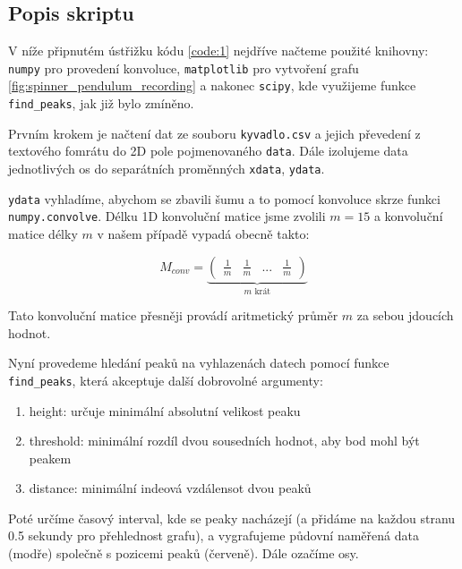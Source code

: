 \documentclass[12pt, a4paper,
 twoside,        %
 openright
]{report}
\begin{document}
\subsection{Popis skriptu}

V níže připnutém ústřižku kódu \ref{code:1} nejdříve načteme použité knihovny: 
\texttt{numpy} \cite{numpy} pro provedení konvoluce, 
\texttt{matplotlib} pro vytvoření grafu \ref{fig:spinner_pendulum_recording} \cite{matplotlib} a nakonec
\texttt{scipy}, kde využijeme funkce \texttt{find\_peaks}, jak již bylo zmíněno.

Prvním krokem je načtení dat ze souboru \texttt{kyvadlo.csv} a jejich převedení z textového fomrátu do 2D pole pojmenovaného \texttt{data}.
Dále izolujeme data jednotlivých os do separátních proměnných \texttt{xdata}, \texttt{ydata}.

\texttt{ydata} vyhladíme, abychom se zbavili šumu a to pomocí konvoluce skrze funkci \texttt{numpy.convolve}.
Délku 1D konvoluční matice jsme zvolili $m = 15$ a konvoluční matice délky $m$ v našem případě vypadá obecně takto:

\begin{equation}
    \label{eq:conv_matrix_avg}
    M_{conv} = 
    \underbrace{
        \begin{pmatrix}
            \frac{1}{m} & \frac{1}{m} & ... & \frac{1}{m}
        \end{pmatrix}
    }_{m\text{ krát}}
\end{equation}

Tato konvoluční matice přesněji provádí aritmetický průměr $m$ za sebou jdoucích hodnot.

Nyní provedeme hledání peaků na vyhlazenách datech pomocí funkce \texttt{find\_peaks}, která akceptuje další dobrovolné argumenty:
\begin{enumerate}[topsep=0pt, partopsep=0pt]
    \setlength{\itemsep}{0pt}%
    \setlength{\parskip}{0pt}%
    \item height: určuje minimální absolutní velikost peaku
    \item threshold: minimální rozdíl dvou sousedních hodnot, aby bod mohl být peakem
    \item distance: minimální indeová vzdálensot dvou peaků
\end{enumerate}

Poté určíme časový interval, kde se peaky nacházejí (a přidáme na každou stranu 0.5 sekundy pro přehlednost grafu),
a vygrafujeme půdovní naměřená data (modře) společně s pozicemi peaků (červeně). Dále ozačíme osy.
\end{document}
